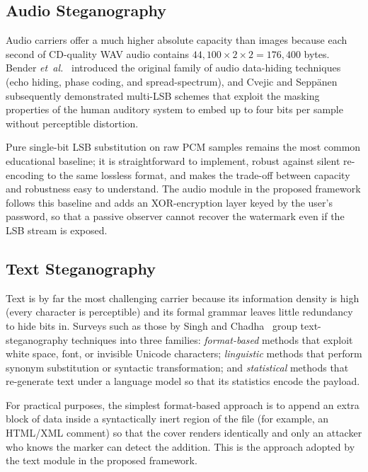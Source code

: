 \subsection{Audio Steganography}

Audio carriers offer a much higher absolute capacity than images because each second of CD-quality WAV audio contains $44{,}100 \times 2 \times 2 = 176{,}400$ bytes. Bender \emph{et~al.}~\cite{bender1996techniques} introduced the original family of audio data-hiding techniques (echo hiding, phase coding, and spread-spectrum), and Cvejic and Sepp{\"a}nen~\cite{cvejic2004increasing} subsequently demonstrated multi-LSB schemes that exploit the masking properties of the human auditory system to embed up to four bits per sample without perceptible distortion.

Pure single-bit LSB substitution on raw PCM samples remains the most common educational baseline; it is straightforward to implement, robust against silent re-encoding to the same lossless format, and makes the trade-off between capacity and robustness easy to understand. The audio module in the proposed framework follows this baseline and adds an XOR-encryption layer keyed by the user's password, so that a passive observer cannot recover the watermark even if the LSB stream is exposed.

\subsection{Text Steganography}

Text is by far the most challenging carrier because its information density is high (every character is perceptible) and its formal grammar leaves little redundancy to hide bits in. Surveys such as those by Singh and Chadha~\cite{singh2013survey} group text-steganography techniques into three families: \emph{format-based} methods that exploit white space, font, or invisible Unicode characters; \emph{linguistic} methods that perform synonym substitution or syntactic transformation; and \emph{statistical} methods that re-generate text under a language model so that its statistics encode the payload.

For practical purposes, the simplest format-based approach is to append an extra block of data inside a syntactically inert region of the file (for example, an HTML/XML comment) so that the cover renders identically and only an attacker who knows the marker can detect the addition. This is the approach adopted by the text module in the proposed framework.

